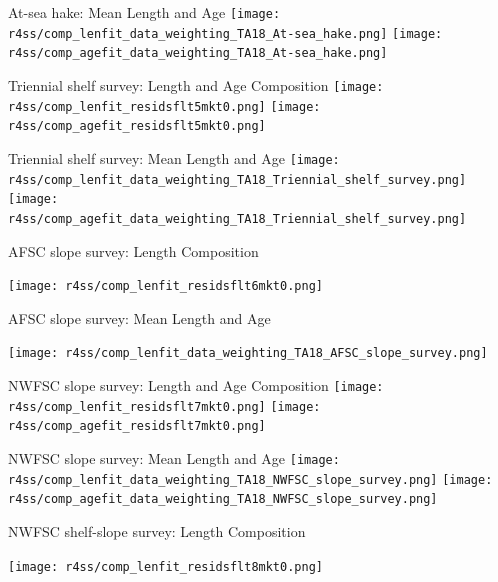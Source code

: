 \documentclass[pdf]{beamer}\usepackage[]{graphicx}\usepackage[]{color}
\begin{document}
\begin{frame}{At-sea hake: Mean Length and Age}
  \texttt{[image: r4ss/comp\_lenfit\_data\_weighting\_TA18\_At-sea\_hake.png]}
  \texttt{[image: r4ss/comp\_agefit\_data\_weighting\_TA18\_At-sea\_hake.png]}
\end{frame}

\begin{frame}{Triennial shelf survey: Length and Age Composition}
  \texttt{[image: r4ss/comp\_lenfit\_residsflt5mkt0.png]}
  \texttt{[image: r4ss/comp\_agefit\_residsflt5mkt0.png]}
\end{frame}

\begin{frame}{Triennial shelf survey: Mean Length and Age}
  \texttt{[image: r4ss/comp\_lenfit\_data\_weighting\_TA18\_Triennial\_shelf\_survey.png]}
  \texttt{[image: r4ss/comp\_agefit\_data\_weighting\_TA18\_Triennial\_shelf\_survey.png]}
\end{frame}

\begin{frame}{AFSC slope survey: Length Composition}
  \begin{center}
  \texttt{[image: r4ss/comp\_lenfit\_residsflt6mkt0.png]}
  \end{center}
\end{frame}

\begin{frame}{AFSC slope survey: Mean Length and Age}
  \begin{center}
  \texttt{[image: r4ss/comp\_lenfit\_data\_weighting\_TA18\_AFSC\_slope\_survey.png]}
  \end{center}
\end{frame}

\begin{frame}{NWFSC slope survey: Length and Age Composition}
  \texttt{[image: r4ss/comp\_lenfit\_residsflt7mkt0.png]}
  \texttt{[image: r4ss/comp\_agefit\_residsflt7mkt0.png]}
\end{frame}

\begin{frame}{NWFSC slope survey: Mean Length and Age}
  \texttt{[image: r4ss/comp\_lenfit\_data\_weighting\_TA18\_NWFSC\_slope\_survey.png]}
  \texttt{[image: r4ss/comp\_agefit\_data\_weighting\_TA18\_NWFSC\_slope\_survey.png]}
\end{frame}

\begin{frame}{NWFSC shelf-slope survey: Length Composition}
  \begin{center}
  \texttt{[image: r4ss/comp\_lenfit\_residsflt8mkt0.png]}
  \end{center}
\end{frame}
\end{document}
